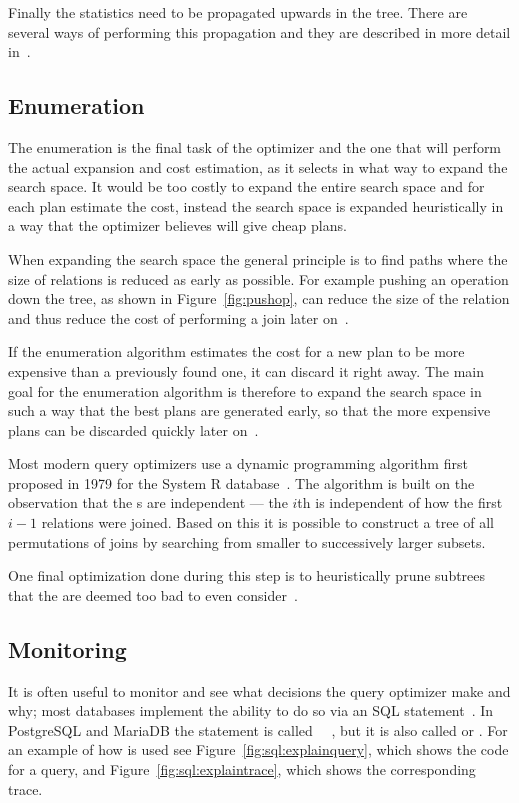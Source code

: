 Finally the statistics need to be propagated upwards in the tree. There are
several ways of performing this propagation and they are described in more
detail in~\cite{chaudhuri_1998_overview_aooqoirs}.

\subsection{Enumeration}
The enumeration is the final task of the optimizer and the one that will perform
the actual expansion and cost estimation, as it selects in what way to expand
the search space. It would be too costly to expand the entire search space and
for each plan estimate the cost, instead the search space is expanded
heuristically in a way that the optimizer believes will give cheap plans.

When expanding the search space the general principle is to find paths where the
size of relations is reduced as early as possible. For example pushing an
operation down the tree, as shown in Figure~\ref{fig:pushop}, can reduce the
size of the relation and thus reduce the cost of performing a join later
on~\cite[p. 772-774]{garcia-molina_2002_database_dstcb}.

If the enumeration algorithm estimates the cost for a new plan to be more
expensive than a previously found one, it can discard it right away. The main
goal for the enumeration algorithm is therefore to expand the search space in
such a way that the best plans are generated early, so that the more expensive
plans can be discarded quickly later on~\cite{nica_2012_analyzing_aqoppojea}.

Most modern query optimizers use a dynamic programming algorithm first proposed
in 1979 for the System R database~\cite{selinger_1979_access_apsiardms}. The
algorithm is built on the observation that the s are independent ---
the $i$th  is independent of how the first $i-1$ relations were
joined. Based on this it is possible to construct a tree of all permutations of
joins by searching from smaller to successively larger subsets.

One final optimization done during this step is to heuristically prune
subtrees that the are deemed too bad to even
consider~\cite{ono_1990_measuring_mtcojeiqo}.

\subsection{Monitoring}
It is often useful to monitor and see what decisions the query optimizer make
and why; most databases implement the ability to do so via an SQL
statement~\cite[p. 34]{lahdenmaki_2005_relational_rdidatodossea}. In PostgreSQL
and MariaDB the statement is called
~\cite{postgresql_pd9e}~\cite{explain_emkb}, but it is also called
 or . For an example of how  is
used see Figure~\ref{fig:sql:explainquery}, which shows the code for a query,
and Figure~\ref{fig:sql:explaintrace}, which shows the corresponding trace.

